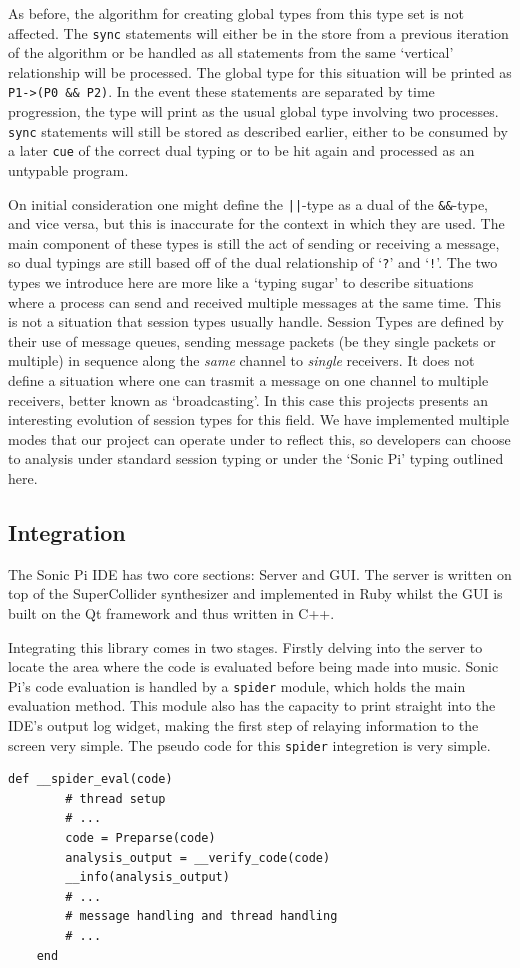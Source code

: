 \documentclass[11pt, abstracton, twoside, titlepage=true]{scrartcl}
\begin{document}
As before, the algorithm for creating global types from this type set is not
affected. The \texttt{sync} statements will either be in the store from a previous
iteration of the algorithm or be handled as all statements from the same `vertical'
relationship will be processed. The global type for this situation will be printed
as \texttt{P1->(P0 \&\& P2)}. In the event these statements are separated by time
progression, the type will print as the usual global type involving two processes.
\texttt{sync} statements will still be stored as described earlier, either to be
consumed by a later \texttt{cue} of the correct dual typing or to be hit again
and processed as an untypable program.

On initial consideration one might define the \texttt{||}-type as a dual of the
\texttt{\&\&}-type, and vice versa, but this is inaccurate for the context in which
they are used. The main component of these types is still the act of sending or
receiving a message, so dual typings are still based off of the dual relationship
of `\texttt{?}' and `\texttt{!}'. The two types we introduce here are more like
a `typing sugar' to describe situations where a process can send and received
multiple messages at the same time. This is not a situation that session types
usually handle. Session Types are defined by their use of message queues, sending
message packets (be they single packets or multiple) in sequence along the 
\emph{same} channel to \emph{single} receivers. It does not define a situation
where one can trasmit a message on one channel to multiple receivers, better known 
as `broadcasting'. In this case
this projects presents an interesting evolution of session types for this field.
We have implemented multiple modes that our project can operate under to reflect
this, so developers can choose to analysis under standard session typing or under 
the `Sonic Pi' typing outlined here.
\newpage

\subsection{Integration}
The Sonic Pi IDE has two core sections: Server and GUI. The server is written on 
top of the SuperCollider synthesizer and implemented in Ruby whilst the GUI is 
built on the Qt framework and thus written in C++.

Integrating this library comes in two stages. Firstly delving into the server to 
locate the area where the code is evaluated before being made into music. Sonic 
Pi's code evaluation is handled by a \texttt{spider} module, which holds the main 
evaluation method. This module also has the capacity to print straight into the 
IDE's output log widget, making the first step of relaying information to the 
screen very simple. The pseudo code for this \texttt{spider} integretion is very
simple.
\\
\begin{lstlisting}[style = sonicpi]
    def __spider_eval(code)
        # thread setup
        # ...
        code = Preparse(code)
        analysis_output = __verify_code(code)
        __info(analysis_output)
        # ...
        # message handling and thread handling
        # ...
    end
\end{lstlisting}
\end{document}
